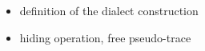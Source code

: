 \begin{itemize}
	\item definition of the dialect construction
	\item hiding operation, free pseudo-trace
\end{itemize}







